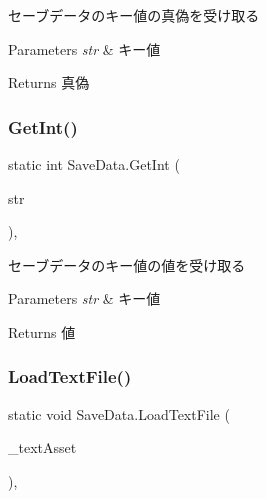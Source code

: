 セーブデータのキー値の真偽を受け取る 


\begin{DoxyParams}{Parameters}
{\em str} & キー値\\
\hline
\end{DoxyParams}
\begin{DoxyReturn}{Returns}
真偽
\end{DoxyReturn}
\mbox{\label{class_save_data_a83d6911b0372d640f07eaa9b08d4be7e}} 
\subsubsection{\texorpdfstring{Get\+Int()}{GetInt()}}
{\footnotesize\ttfamily static int Save\+Data.\+Get\+Int (\begin{DoxyParamCaption}\item[{string}]{str }\end{DoxyParamCaption})\hspace{0.3cm}{\ttfamily [inline]}, {\ttfamily [static]}}



セーブデータのキー値の値を受け取る 


\begin{DoxyParams}{Parameters}
{\em str} & キー値\\
\hline
\end{DoxyParams}
\begin{DoxyReturn}{Returns}
値
\end{DoxyReturn}
\mbox{\label{class_save_data_a8e9426f54bee1a34f8b95f083d13bd7d}} 
\subsubsection{\texorpdfstring{Load\+Text\+File()}{LoadTextFile()}}
{\footnotesize\ttfamily static void Save\+Data.\+Load\+Text\+File (\begin{DoxyParamCaption}\item[{Text\+Asset}]{\+\_\+text\+Asset }\end{DoxyParamCaption})\hspace{0.3cm}{\ttfamily [inline]}, {\ttfamily [static]}}



